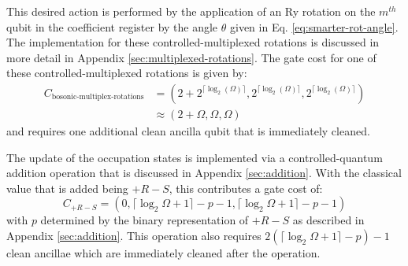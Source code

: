 This desired action is performed by the application of an Ry rotation on the $m^{th}$ qubit in the coefficient register by the angle $\theta$ given in Eq. \ref{eq:smarter-rot-angle}.
The implementation for these controlled-multiplexed rotations is discussed in more detail in Appendix \ref{sec:multiplexed-rotations}.
The gate cost for one of these controlled-multiplexed rotations is given by:
\begin{equation}
    \begin{split}
        C_{\text{bosonic-multiplex-rotations}} &= (2 + 2^{\lceil \log_2(\Omega) \rceil}, 2^{\lceil \log_2(\Omega) \rceil}, 2^{\lceil \log_2(\Omega) \rceil}) \\
        &\approx (2 + \Omega, \Omega, \Omega)
    \end{split}
\end{equation}
and requires one additional clean ancilla qubit that is immediately cleaned.

The update of the occupation states is implemented via a controlled-quantum addition operation that is discussed in Appendix \ref{sec:addition}.
With the classical value that is added being $+ R - S$, this contributes a gate cost of:
\begin{equation}
    C_{+ R - S} = (0, \lceil \log_2{\Omega + 1} \rceil - p - 1, \lceil \log_2{\Omega + 1} \rceil - p - 1)
\end{equation}
with $p$ determined by the binary representation of $+ R - S$ as described in Appendix \ref{sec:addition}.
This operation also requires $2(\lceil \log_2{\Omega + 1} \rceil - p) - 1$ clean ancillae which are immediately cleaned after the operation.

